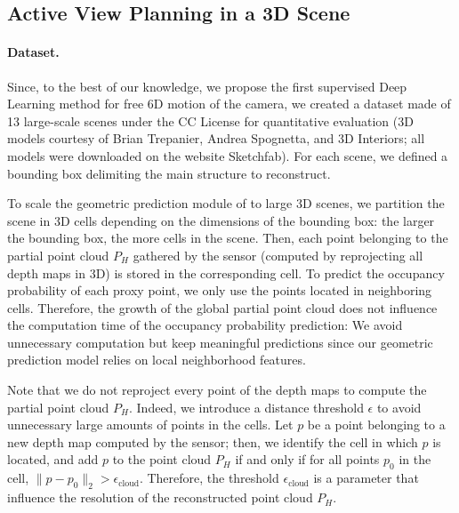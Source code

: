 \subsection{Active View Planning in a 3D Scene}
\label{sec:supp_mat_view_planning_in_scene}

\paragraph{Dataset.}
Since, to the best of our knowledge, we propose the first supervised Deep Learning method for free 6D motion of the camera, we created a dataset made of 13 large-scale scenes under the CC License for quantitative evaluation (3D models courtesy of Brian Trepanier, Andrea Spognetta, and 3D Interiors; all models were downloaded on the website Sketchfab). For each scene, we defined a bounding box delimiting the main structure to reconstruct. %

To scale the geometric prediction module of \method to large 3D scenes, we partition the scene in 3D cells depending on the dimensions of the bounding box: the larger the bounding box, the more cells in the scene. Then, each point belonging to the partial point cloud $P_H$ gathered by the sensor (computed by reprojecting all depth maps in 3D) is stored in the corresponding cell. To predict the occupancy probability of each proxy point, we only use the points located in neighboring cells. Therefore, the growth of the global partial point cloud does not influence the computation time of the occupancy probability prediction: We avoid unnecessary computation but keep meaningful predictions since our geometric prediction model relies on local neighborhood features.

Note that we do not reproject every point of the depth maps to compute the partial point cloud $P_H$. Indeed, we introduce a distance threshold $\epsilon$ to avoid unnecessary large amounts of points in the cells. Let $p$ be a point belonging to a new depth map computed by the sensor; then, we identify the cell in which $p$ is located, and add $p$ to the point cloud $P_H$ if and only if for all points $p_0$ in the cell, $\|p-p_0\|_2 > \epsilon_\text{cloud}$. Therefore, the threshold $\epsilon_\text{cloud}$ is a parameter that influence the resolution of the reconstructed point cloud $P_H$.


